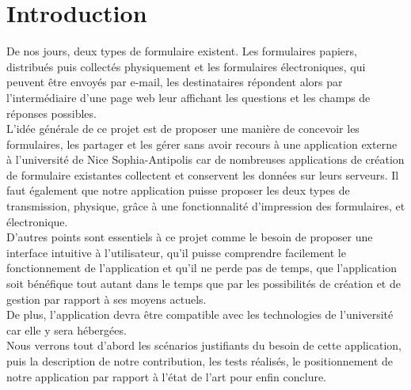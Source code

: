 \documentclass{sigplanconf}
\begin{document}
\section{Introduction}
De nos jours, deux types de formulaire existent. Les formulaires papiers, distribués puis collectés physiquement et les formulaires électroniques, qui peuvent être envoyés par e-mail, les destinataires répondent alors par l’intermédiaire d’une page web leur affichant les questions et les champs de réponses possibles.\\
L’idée générale de ce projet est de proposer une manière de concevoir les formulaires, les partager et les gérer sans avoir recours à une application externe à l’université de Nice Sophia-Antipolis car de nombreuses applications de création de formulaire existantes collectent et conservent les données sur leurs serveurs. Il faut également que notre application puisse proposer les deux types de transmission, physique, grâce à une fonctionnalité d’impression des formulaires, et électronique.\\
D’autres points sont essentiels à ce projet comme le besoin de proposer une interface intuitive à l’utilisateur, qu’il puisse comprendre facilement le fonctionnement de l’application et qu’il ne perde pas de temps, que l’application soit bénéfique tout autant dans le temps que par les possibilités de création et de gestion par rapport à ses moyens actuels. \\
De plus, l’application devra être compatible avec les technologies de l’université car elle y sera hébergées.\\

Nous verrons tout d'abord les scénarios justifiants du besoin de cette application, puis la description de notre contribution, les tests réalisés, le positionnement de notre application par rapport à l'état de l'art pour enfin conclure.


\end{document}
